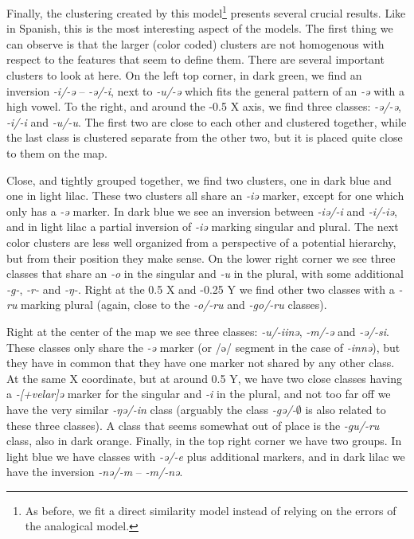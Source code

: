 Finally, the clustering created by this model\footnote{As before, we fit a direct similarity model instead of relying on the errors of the analogical model.} presents several crucial results. Like in Spanish, this is the most interesting aspect of the models. The first thing we can observe is that the larger (color coded) clusters are not homogenous with respect to the features that seem to define them. There are several important clusters to look at here. On the left top corner, in dark green, we find an inversion \textit{-i/-ə} -- \textit{-ə/-i}, next to \textit{-u/-ə} which fits the general pattern of an \textit{-ə} with a high vowel. To the right, and around the -0.5 X axis, we find three classes: \textit{-ə/-ə}, \textit{-i/-i} and \textit{-u/-u}. The first two are close to each other and clustered together, while the last class is clustered separate from the other two, but it is placed quite close to them on the map.

Close, and tightly grouped together, we find two clusters, one in dark blue and one in light lilac. These two clusters all share an \textit{-iə} marker, except for one which only has a \textit{-ə} marker. In dark blue we see an inversion between \textit{-iə/-i} and \textit{-i/-iə}, and in light lilac a partial inversion of \textit{-iə} marking singular and plural. The next color clusters are less well organized from a perspective of a potential hierarchy, but from their position they make sense. On the lower right corner we see three classes that share an \textit{-o} in the singular and \textit{-u} in the plural, with some additional \textit{-g-}, \textit{-r-} and \textit{-ŋ-}. Right at the 0.5 X and -0.25 Y we find other two classes with a \textit{-ru} marking plural (again, close to the \textit{-o/-ru} and \textit{-go/-ru} classes).

Right at the center of the map we see three classes: \textit{-u/-iinə}, \textit{-m/-ə} and \textit{-ə/-si}. These classes only share the \textit{-ə} marker (or /ə/ segment in the case of \textit{-innə}), but they have in common that they have one marker not shared by any other class. At the same X coordinate, but at around 0.5 Y, we have two close classes having a \textit{-[+velar]ə} marker for the singular and \textit{-i} in the plural, and not too far off we have the very similar \textit{-ŋə/-in} class (arguably the class \textit{-gə/-$\emptyset$} is also related to these three classes). A class that seems somewhat out of place is the \textit{-gu/-ru} class, also in dark orange. Finally, in the top right corner we have two groups. In light blue we have classes with \textit{-ə/-e} plus additional markers, and in dark lilac we have the inversion \textit{-nə/-m} -- \textit{-m/-nə}.

